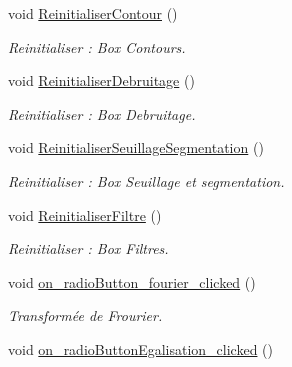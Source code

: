 \begin{DoxyCompactItemize}
\mbox{\label{classMainWindow_ae0d786ec22520c25dcd34dbca7e1469b}} 
void \hyperlink{classMainWindow_ae0d786ec22520c25dcd34dbca7e1469b}{Reinitialiser\+Contour} ()
\begin{DoxyCompactList}\small\item\em Reinitialiser \+: Box Contours. \end{DoxyCompactList}\item 
\mbox{\label{classMainWindow_a6b8c6ba3326af79981bb6f8590080261}} 
void \hyperlink{classMainWindow_a6b8c6ba3326af79981bb6f8590080261}{Reinitialiser\+Debruitage} ()
\begin{DoxyCompactList}\small\item\em Reinitialiser \+: Box Debruitage. \end{DoxyCompactList}\item 
\mbox{\label{classMainWindow_a3020a2c1b7baa34fe4efb1acc9b5ec9c}} 
void \hyperlink{classMainWindow_a3020a2c1b7baa34fe4efb1acc9b5ec9c}{Reinitialiser\+Seuillage\+Segmentation} ()
\begin{DoxyCompactList}\small\item\em Reinitialiser \+: Box Seuillage et segmentation. \end{DoxyCompactList}\item 
\mbox{\label{classMainWindow_aba12787d81815d7519c98caae1f4d1cf}} 
void \hyperlink{classMainWindow_aba12787d81815d7519c98caae1f4d1cf}{Reinitialiser\+Filtre} ()
\begin{DoxyCompactList}\small\item\em Reinitialiser \+: Box Filtres. \end{DoxyCompactList}\item 
\mbox{\label{classMainWindow_aa1da2bfa32a98ddfe7724f8b58d07dab}} 
void \hyperlink{classMainWindow_aa1da2bfa32a98ddfe7724f8b58d07dab}{on\+\_\+radio\+Button\+\_\+fourier\+\_\+clicked} ()
\begin{DoxyCompactList}\small\item\em Transformée de Frourier. \end{DoxyCompactList}\item 
\mbox{\label{classMainWindow_a746e53ef1b2e87f421756acd96844096}} 
void \hyperlink{classMainWindow_a746e53ef1b2e87f421756acd96844096}{on\+\_\+radio\+Button\+Egalisation\+\_\+clicked} ()

\end{DoxyCompactItemize}
